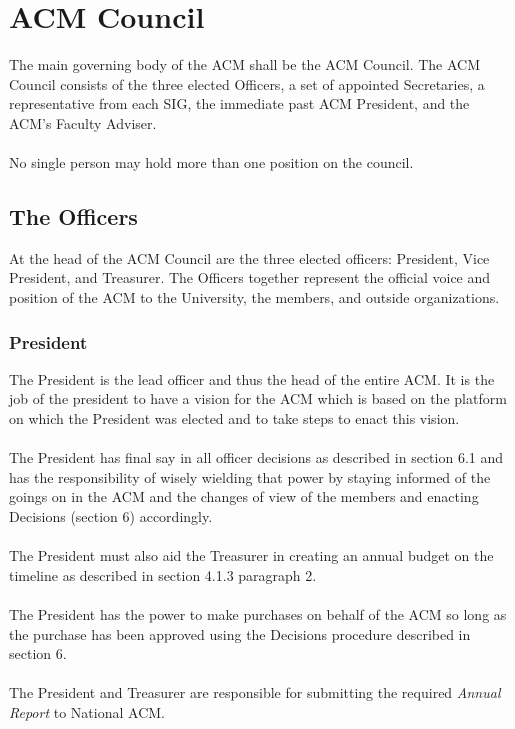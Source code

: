 \documentclass[12pt,titlepage]{article}
\begin{document}
\section{ACM Council}

The main governing body of the ACM shall be the ACM Council. The ACM Council consists of the three elected Officers, a set of appointed Secretaries, a representative from each SIG, the immediate past ACM President, and the ACM's Faculty Adviser.\\
\\
No single person may hold more than one position on the council.

\subsection{The Officers}

At the head of the ACM Council are the three elected officers: President, Vice President, and Treasurer. The Officers together represent the official voice and position of the ACM to the University, the members, and outside organizations.

\subsubsection{President}

The President is the lead officer and thus the head of the entire ACM. It is the job of the president to have a vision for the ACM which is based on the platform on which the President was elected and to take steps to enact this vision.\\
\\
The President has final say in all officer decisions as described in section 6.1 and has the responsibility of wisely wielding that power by staying informed of the goings on in the ACM and the changes of view of the members and enacting Decisions (section 6) accordingly.\\
\\
The President must also aid the Treasurer in creating an annual budget on the timeline as described in section 4.1.3 paragraph 2.\\
\\
The President has the power to make purchases on behalf of the ACM so long as the purchase has been approved using the Decisions procedure described in section 6.\\
\\
The President and Treasurer are responsible for submitting the required \emph{Annual Report} to National ACM.
\end{document}
